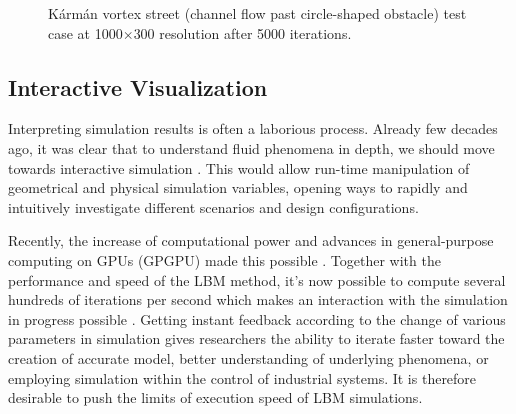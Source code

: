 \begin{figure}[!ht]
	\centering
	 \par
	\caption{Kármán vortex street (channel flow past circle-shaped obstacle) test case at 1000$\times$300 resolution after 5000 iterations.}
	\label{fig:d2q9_channel}
\end{figure}


\subsection{Interactive Visualization}
\label{interactive-simulation}
Interpreting simulation results is often a laborious process. Already few decades ago, it was clear that to understand fluid phenomena in depth, we should move towards interactive simulation \citep{frischLatticeGasAutomataNavierStokes1986}. This would allow run-time manipulation of geometrical and physical simulation variables, opening ways to rapidly and intuitively investigate different scenarios and design configurations.

Recently, the increase of computational power and advances in general-purpose computing on GPUs (GPGPU) made this possible  \citep{delboscRealTimeSimulationIndoor, harwoodParallelisationInteractiveLatticeBoltzmann2017, kolihaOnlineVisualizationInteractive2015, glessmerUsingInteractiveLattice2017}. Together with the performance and speed of the LBM method, it's now possible to compute several hundreds of iterations per second which makes an interaction with the simulation in progress possible \citep{wangInteractive3DFluid2019}. Getting instant feedback according to the change of various parameters in simulation gives researchers the ability to iterate faster toward the creation of accurate model, better understanding of underlying phenomena, or employing simulation within the control of industrial systems. It is therefore desirable to push the limits of execution speed of LBM simulations.

